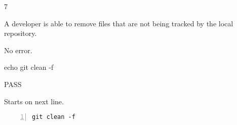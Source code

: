 \begin{description}[align=right,leftmargin=3.2cm,labelindent=3.0cm]
\item[Step:] 7
\item[Confirm:] A developer is able to remove files that are not being tracked by the local repository.
\item[Expectation:] No error.
\item[Command:] echo git  clean -f
\item[Test Result:] PASS
\item[Evidence:] Starts on next line.
\end{description}
\begin{lstlisting}[numbers=left]
git clean -f

\end{lstlisting}
